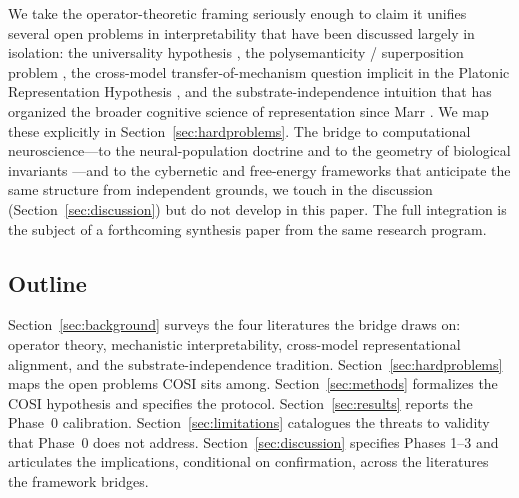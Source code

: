 We take the operator-theoretic framing seriously enough to claim it
unifies several open problems in interpretability that have been
discussed largely in isolation: the universality hypothesis
\cite{olah2020zoom, chughtai2023toy}, the polysemanticity / superposition
problem \cite{elhage2022superposition}, the cross-model
transfer-of-mechanism question implicit in the Platonic Representation
Hypothesis \cite{huh2024platonic}, and the substrate-independence
intuition that has organized the broader cognitive science of
representation since Marr \cite{marr1982vision}. We map these
explicitly in Section~\ref{sec:hardproblems}. The bridge to
computational neuroscience---to the neural-population doctrine
\cite{saxena2019towards} and to the geometry of biological invariants
\cite{okeefe1971hippocampus, hafting2005microstructure, gallego2017neural,
yamins2016using}---and to the cybernetic and free-energy frameworks
\cite{ashby1956introduction, friston2010free, achille2018emergence}
that anticipate the same structure from independent grounds, we touch
in the discussion (Section~\ref{sec:discussion}) but do not develop in
this paper. The full integration is the subject of a forthcoming
synthesis paper from the same research program.

\subsection*{Outline}

Section~\ref{sec:background} surveys the four literatures the bridge
draws on: operator theory, mechanistic interpretability, cross-model
representational alignment, and the substrate-independence tradition.
Section~\ref{sec:hardproblems} maps the open problems COSI sits
among. Section~\ref{sec:methods} formalizes the COSI hypothesis and
specifies the protocol. Section~\ref{sec:results} reports the Phase~0
calibration. Section~\ref{sec:limitations} catalogues the threats to
validity that Phase~0 does not address. Section~\ref{sec:discussion}
specifies Phases 1--3 and articulates the implications, conditional on
confirmation, across the literatures the framework bridges.
